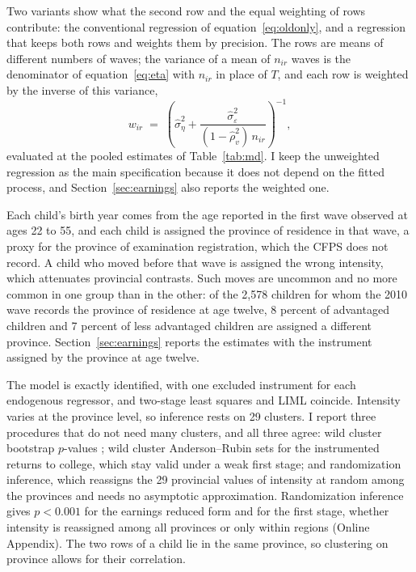 \documentclass[11pt]{article}
\begin{document}
Two variants show what the second row and the equal weighting of rows contribute: the conventional regression of equation~\eqref{eq:oldonly}, and a regression that keeps both rows and weights them by precision. The rows are means of different numbers of waves; the variance of a mean of $n_{ir}$ waves is the denominator of equation~\eqref{eq:eta} with $n_{ir}$ in place of $T$, and each row is weighted by the inverse of this variance,
\begin{equation}
w_{ir} \;=\; \left( \hat\sigma^2_\eta +
\frac{\hat\sigma^2_\varepsilon}{(1 - \hat\rho_v^2)\, n_{ir}}
\right)^{-1},
\label{eq:weights}
\end{equation}
evaluated at the pooled estimates of Table~\ref{tab:md}. I keep the unweighted regression as the main specification because it does not depend on the fitted process, and Section~\ref{sec:earnings} also reports the weighted one.

Each child's birth year comes from the age reported in the first wave observed at ages 22 to 55, and each child is assigned the province of residence in that wave, a proxy for the province of examination registration, which the CFPS does not record. A child who moved before that wave is assigned the wrong intensity, which attenuates provincial contrasts. Such moves are uncommon and no more common in one group than in the other: of the 2,578 children for whom the 2010 wave records the province of residence at age twelve, 8 percent of advantaged children and 7 percent of less advantaged children are assigned a different province. Section~\ref{sec:earnings} reports the estimates with the instrument assigned by the province at age twelve.

The model is exactly identified, with one excluded instrument
for each endogenous regressor, and
two-stage least squares and LIML coincide. Intensity varies at
the province level, so inference rests on 29 clusters. I report three procedures that do not need many clusters, and all three agree: wild cluster bootstrap $p$-values \citep[Rademacher weights by province, null imposed, 9,999 replications;][]{CameronGelbachMiller2008}; wild cluster Anderson--Rubin sets for the instrumented returns to college, which stay valid under a weak first stage; and randomization inference, which reassigns the 29 provincial values of intensity at random among the provinces and needs no asymptotic approximation. Randomization inference gives $p < 0.001$ for the earnings reduced form and for the first stage, whether intensity is reassigned among all provinces or only within regions (Online Appendix). The
two rows of a child lie in the same province, so clustering on province
allows for their correlation.
\end{document}
